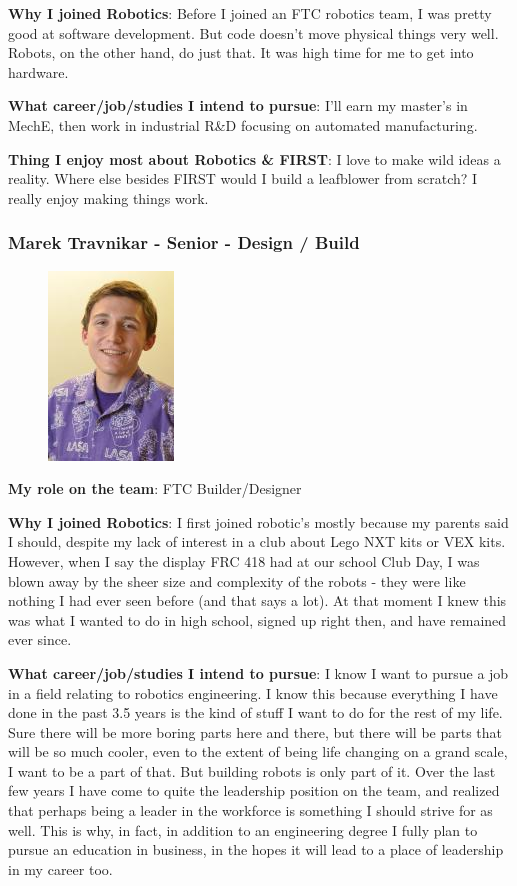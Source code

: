 {\bf Why I joined Robotics}: Before I joined an FTC robotics team, I was pretty good at software development. But code doesn't move physical things very well. Robots, on the other hand, do just that. It was high time for me to get into hardware.

{\bf What career/job/studies I intend to pursue}: I'll earn my master's in MechE, then work in industrial R\&D focusing on automated manufacturing.

{\bf Thing I enjoy most about Robotics \& FIRST}: I love to make wild ideas a reality. Where else besides FIRST would I build a leafblower from scratch? I really enjoy making things work.  

\subsubsection{Marek Travnikar - Senior - Design / Build} 
\begin{figure}[H]
	\includegraphics[width=0.2\linewidth]{marek}
\end{figure}
{\bf My role on the team}: FTC Builder/Designer 

{\bf Why I joined Robotics}: I first joined robotic's mostly because my parents said I should, despite my lack of interest in a club about Lego NXT kits or VEX kits. However, when I say the display FRC 418 had at our school Club Day, I was blown away by the sheer size and complexity of the robots - they were like nothing I had ever seen before (and that says a lot). At that moment I knew this was what I wanted to do in high school, signed up right then, and have remained ever since.

{\bf What career/job/studies I intend to pursue}: I know I want to pursue a job in a field relating to robotics engineering. I know this because everything I have done in the past 3.5 years is the kind of stuff I want to do for the rest of my life. Sure there will be more boring parts here and there, but there will be parts that will be so much cooler, even to the extent of being life changing on a grand scale, I want to be a part of that.  But building robots is only part of it. Over the last few years I have come to quite the leadership position on the team, and realized that perhaps being a leader in the workforce is something I should strive for as well. This is why, in fact, in addition to an engineering degree I fully plan to pursue an education in business, in the hopes it will lead to a place of leadership in my career too.


